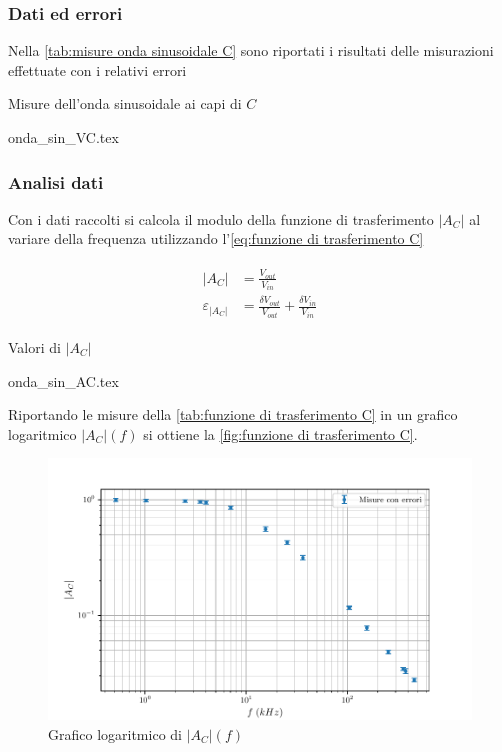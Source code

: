 \documentclass[11pt, a4paper]{article}
\numberwithin{equation}{section} %
\begin{document}
\subsubsection{Dati ed errori}

Nella \autoref{tab:misure onda sinusoidale C} sono riportati i risultati delle misurazioni effettuate con i relativi errori

\begin{table}[ht!]
    \centering
    \caption{Misure dell'onda sinusoidale ai capi di $C$}
    {onda_sin_VC.tex}
    \label{tab:misure onda sinusoidale C}
\end{table}

\subsubsection{Analisi dati}

Con i dati raccolti si calcola il modulo della funzione di trasferimento $|A_{C}|$ al variare della frequenza utilizzando l'\autoref{eq:funzione di trasferimento C}

\begin{align} \label{eq:funzione di trasferimento C}
    \begin{split}
        |A_{C}| &= \frac{V_{out}}{V_{in}} \\
        \varepsilon_{|A_{C}|} &= \frac{\delta V_{out}}{V_{out}} + \frac{\delta V_{in}}{V_{in}}
    \end{split}
\end{align}

\begin{table}[ht!]
    \centering
    \caption{Valori di $|A_{C}|$}
    {onda_sin_AC.tex}
    \label{tab:funzione di trasferimento C}
\end{table}

Riportando le misure della \autoref{tab:funzione di trasferimento C} in un grafico logaritmico $|A_{C}|(f)$ si ottiene la \autoref{fig:funzione di trasferimento C}.

\begin{figure}[ht!]
    \includegraphics{onda_sin_AC(f).pdf}
    \caption{Grafico logaritmico di $|A_{C}|(f)$}
    \label{fig:funzione di trasferimento C}
\end{figure}
\end{document}
